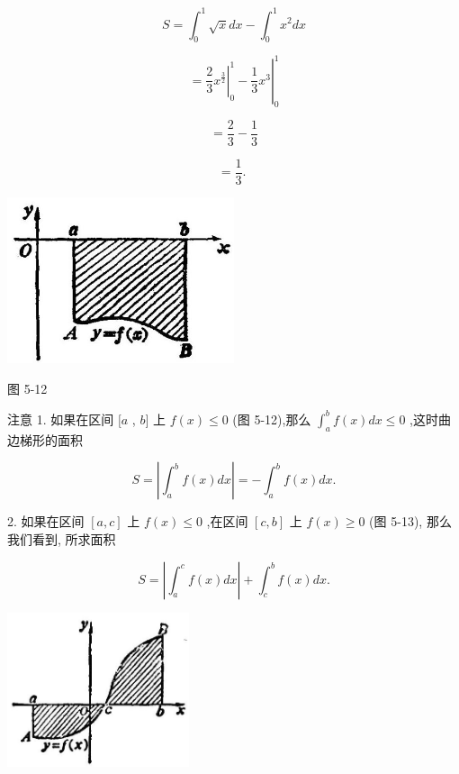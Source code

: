 \documentclass[lang=cn,newtx,10pt,scheme=chinese]{elegantbook}
\begin{document}
\[
S = {\int }_{0}^{1}\sqrt{x}{dx} - {\int }_{0}^{1}{x}^{2}{dx}
\]

\[
= {\left. {\left. \frac{2}{3}{x}^{\frac{3}{2}}\right| }_{0}^{1} - \frac{1}{3}{x}^{3}\right| }_{0}^{1}
\]

\[
= \frac{2}{3} - \frac{1}{3}
\]

\[
= \frac{1}{3}\text{. }
\]

\begin{center}
\includegraphics[max width=0.5\textwidth]{images/01912c18-5c3f-733d-b775-749ba9897a9d_234_549966.jpg}
\end{center}

图 5-12

注意 1. 如果在区间 \(\lbrack a\) , \(b\rbrack\) 上 \(f\left( x\right) \leq 0\) (图 5-12),那么 \({\int }_{a}^{b}f\left( x\right) {dx} \leq 0\) ,这时曲边梯形的面积

\[
S = \left| {{\int }_{a}^{b}f\left( x\right) {dx}}\right| = - {\int }_{a}^{b}f\left( x\right) {dx}.
\]

2. 如果在区间 \(\left\lbrack {a,c}\right\rbrack\) 上 \(f\left( x\right) \leq 0\) ,在区间 \(\left\lbrack {c,b}\right\rbrack\) 上 \(f\left( x\right) \geq 0\) (图 5-13), 那么我们看到, 所求面积

\[
S = \left| {{\int }_{a}^{c}f\left( x\right) {dx}}\right| + {\int }_{c}^{b}f\left( x\right) {dx}.
\]

\begin{center}
\includegraphics[max width=0.4\textwidth]{images/01912c18-5c3f-733d-b775-749ba9897a9d_235_691141.jpg}
\end{center}
\end{document}
